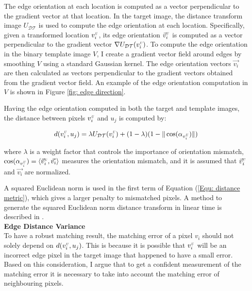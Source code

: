 \documentclass{iitthesis}
\begin{document}
The edge orientation at each location is computed as a vector perpendicular to the gradient vector at that location. In the target image, the distance transform image $U_{\mathcal{DT}}$ is used to compute the edge orientation at each location. Specifically, given a transformed location $v_i^{\scalebox{.5}{\textit{U}}}$, its edge orientation $\vec{v}_i^{\scalebox{.5}{\textit{U}}}$ is computed as a vector perpendicular to the gradient vector $\nabla{U_{\mathcal{DT}}(v_i^{\scalebox{.5}{\textit{U}}})}$. To compute the edge orientation in the binary template image $V$, I create a gradient vector field around edges by smoothing $V$ using a standard Gaussian kernel. The edge orientation vectors $\vec{v_i}$ are then calculated as vectors perpendicular to the gradient vectors obtained from the gradient vector field. An example of the edge orientation computation in $V$ is shown in Figure \ref{fig: edge direction}.

Having the edge orientation computed in both the target and template images, the distance between pixels ${v}_i^{\scalebox{.5}{\textit{U}}}$ and $u_j$ is computed by:

\begin{equation}
d(v_i^{\scalebox{.5}{\textit{U}}}, u_j)=\lambda U_{\mathcal{DT}}(v_i^{\scalebox{.5}{\textit{U}}}) + (1-\lambda)(1- \|\cos(\alpha_{v_i^{\scalebox{.5}{\textit{U}}}})\|)
\label{Equ: distance metric}
\end{equation}

where $\lambda$ is a weight factor that controls the importance of orientation mismatch, $\cos(\alpha_{v_i^{\scalebox{.5}{\textit{U}}}})=\langle{\vec{v}_i^{\scalebox{.5}{\textit{U}}}}, \vec{v_i} \rangle$ measures the orientation mismatch, and it is assumed that $\vec{v}_i^{\scalebox{.5}{\textit{U}}}$ and $\vec{v_i}$ are normalized.

A squared Euclidean norm is used in the first term of Equation (\ref{Equ: distance metric}), which gives a larger penalty to mismatched pixels. A method to generate the squared Euclidean norm distance transform in linear time is described in \cite{PF:04}.
\\

\begingroup
    \fontsize{11pt}{0}\selectfont
     \noindent  \textbf{Edge Distance Variance}
\endgroup
\vspace{2 mm}\\
To have a robust matching result, the matching error of a pixel $v_i$ should not solely depend on $d(v_i^{\scalebox{.5}{\textit{U}}}, u_j)$. This is because it is possible that $v_i^{\scalebox{.5}{\textit{U}}}$ will be an incorrect edge pixel in the target image that happened to have a small error. Based on this consideration, I argue that to get a confident measurement of the matching error it is necessary to take into account the matching error of neighbouring pixels.
\end{document}
